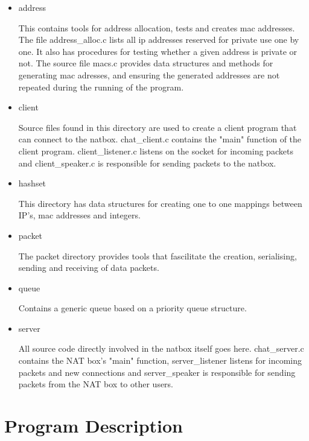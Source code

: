 \documentclass{article}
\begin{document}
\begin{itemize}

    \item address
    
    This contains tools for address allocation, tests and creates mac addresses. The file address\_alloc.c lists all ip addresses reserved for private use one by one.  It also has procedures for testing whether a given address is private or not. The source file macs.c provides data structures and methods for generating mac adresses, and ensuring the generated addresses are not repeated during the running of the program.  
    
    \item client
    
    Source files found in this directory are used to create a client program that can connect to the natbox.  chat\_client.c contains the "main" function of the client program.  client\_listener.c listens on the socket for incoming packets and client\_speaker.c is responsible for sending packets to the natbox.  
    
    \item hashset
    
    This directory has data structures for creating one to one mappings between IP's, mac addresses and integers.  
    
    \item packet
    
    The packet directory provides tools that fascilitate the creation, serialising, sending and receiving of data packets.  
    
    \item queue
    
    Contains a generic queue based on a priority queue structure. 
    
    \item server
    
    All source code directly involved in the natbox itself goes here.  chat\_server.c contains the NAT box's "main" function, server\_listener listens for incoming packets and new connections and server\_speaker is responsible for sending packets from the NAT box to other users.
    
\end{itemize}


\section{Program Description}
\end{document}
